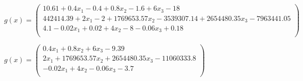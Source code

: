 \documentclass{article}
\begin{document}
\(
g(x) =
\begin{pmatrix}
10.61+0.4x_1-0.4+0.8x_2 - 1.6+6x_3-18\\
442414.39+2x_1-2+1769653.57x_2-3539307.14+2654480.35x_3-7963441.05\\
4.1-0.02x_1+0.02+4x_2-8-0.06x_3+0.18\\
\end{pmatrix}
\)

\(
g(x) =
\begin{pmatrix}
0.4x_1+0.8x_2+6x_3-9.39\\
2x_1+1769653.57x_2+2654480.35x_3-11060333.8\\
-0.02x_1+4x_2-0.06x_3-3.7\\
\end{pmatrix}
\)
\end{document}
